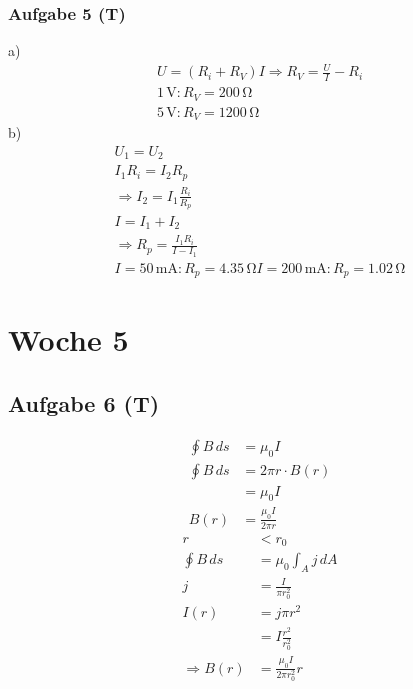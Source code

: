 \documentclass{article}
\begin{document}
\subsubsection*{Aufgabe 5 (T)}
a)\begin{eqnarray*}
    U=(R_i+R_V)I \Rightarrow R_V = \frac{U}{I}-R_i\\
    1\,\mathrm{V}: R_V = 200\,\mathrm{\Omega}\\
    5\,\mathrm{V}: R_V = 1200\,\mathrm{\Omega}
\end{eqnarray*}
b)\begin{eqnarray*}
    U_1 = U_2\\
    I_1R_i = I_2R_p\\
    \Rightarrow I_2=I_1\frac{R_i}{R_p}\\
    I=I_1+I_2\\
    \Rightarrow R_p = \frac{I_1R_i}{I - I_1}\\
    I=50\,\mathrm{mA}:  R_p = 4.35\,\mathrm{\Omega}
    I=200\,\mathrm{mA}:  R_p = 1.02\,\mathrm{\Omega}
\end{eqnarray*}

\section*{Woche 5}
\subsection*{Aufgabe 6 (T)}
\begin{align*}
    \oint B\,ds &= \mu_0 I\\
    \oint B\,ds &= 2\pi r \cdot B(r)\\
    &= \mu_0 I\\
    B(r) &= \frac{\mu_0I}{2\pi r}
\end{align*}
\begin{align*}
    r&<r_0\\
    \oint B\,ds &= \mu_0 \int_{A} j\,dA\\
    j &= \frac{I}{\pi r_0^2}\\
    I(r)&=j\pi r^2\\
    &= I \frac{r^2}{r_0^2}\\
    \Rightarrow B(r) &= \frac{\mu_0 I}{2\pi r_0^2}r
\end{align*}
\end{document}
